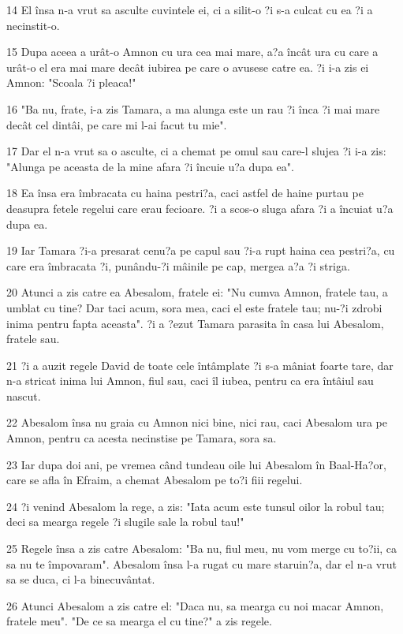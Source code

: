 \par 14 El însa n-a vrut sa asculte cuvintele ei, ci a silit-o ?i s-a culcat cu ea ?i a necinstit-o.
\par 15 Dupa aceea a urât-o Amnon cu ura cea mai mare, a?a încât ura cu care a urât-o el era mai mare decât iubirea pe care o avusese catre ea. ?i i-a zis ei Amnon: "Scoala ?i pleaca!"
\par 16 "Ba nu, frate, i-a zis Tamara, a ma alunga este un rau ?i înca ?i mai mare decât cel dintâi, pe care mi l-ai facut tu mie".
\par 17 Dar el n-a vrut sa o asculte, ci a chemat pe omul sau care-l slujea ?i i-a zis: "Alunga pe aceasta de la mine afara ?i încuie u?a dupa ea".
\par 18 Ea însa era îmbracata cu haina pestri?a, caci astfel de haine purtau pe deasupra fetele regelui care erau fecioare. ?i a scos-o sluga afara ?i a încuiat u?a dupa ea.
\par 19 Iar Tamara ?i-a presarat cenu?a pe capul sau ?i-a rupt haina cea pestri?a, cu care era îmbracata ?i, punându-?i mâinile pe cap, mergea a?a ?i striga.
\par 20 Atunci a zis catre ea Abesalom, fratele ei: "Nu cumva Amnon, fratele tau, a umblat cu tine? Dar taci acum, sora mea, caci el este fratele tau; nu-?i zdrobi inima pentru fapta aceasta". ?i a ?ezut Tamara parasita în casa lui Abesalom, fratele sau.
\par 21 ?i a auzit regele David de toate cele întâmplate ?i s-a mâniat foarte tare, dar n-a stricat inima lui Amnon, fiul sau, caci îl iubea, pentru ca era întâiul sau nascut.
\par 22 Abesalom însa nu graia cu Amnon nici bine, nici rau, caci Abesalom ura pe Amnon, pentru ca acesta necinstise pe Tamara, sora sa.
\par 23 Iar dupa doi ani, pe vremea când tundeau oile lui Abesalom în Baal-Ha?or, care se afla în Efraim, a chemat Abesalom pe to?i fiii regelui.
\par 24 ?i venind Abesalom la rege, a zis: "Iata acum este tunsul oilor la robul tau; deci sa mearga regele ?i slugile sale la robul tau!"
\par 25 Regele însa a zis catre Abesalom: "Ba nu, fiul meu, nu vom merge cu to?ii, ca sa nu te împovaram". Abesalom însa l-a rugat cu mare staruin?a, dar el n-a vrut sa se duca, ci l-a binecuvântat.
\par 26 Atunci Abesalom a zis catre el: "Daca nu, sa mearga cu noi macar Amnon, fratele meu". "De ce sa mearga el cu tine?" a zis regele.
